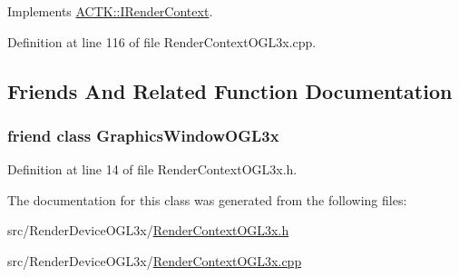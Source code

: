 Implements \hyperlink{class_a_c_t_k_1_1_i_render_context_a54c06790c64d628be8d6c164c375e4fb}{A\-C\-T\-K\-::\-I\-Render\-Context}.



Definition at line 116 of file Render\-Context\-O\-G\-L3x.\-cpp.



\subsection{Friends And Related Function Documentation}
\hypertarget{class_a_c_t_k_1_1_render_context_o_g_l3x_a9b67093b8ba94e79db00917996d1440a}{
\subsubsection[{Graphics\-Window\-O\-G\-L3x}]{\setlength{\rightskip}{0pt plus 5cm}friend class {\bf Graphics\-Window\-O\-G\-L3x}\hspace{0.3cm}{\ttfamily [friend]}}}\label{class_a_c_t_k_1_1_render_context_o_g_l3x_a9b67093b8ba94e79db00917996d1440a}


Definition at line 14 of file Render\-Context\-O\-G\-L3x.\-h.



The documentation for this class was generated from the following files\-:\begin{DoxyCompactItemize}
\item 
src/\-Render\-Device\-O\-G\-L3x/\hyperlink{_render_context_o_g_l3x_8h}{Render\-Context\-O\-G\-L3x.\-h}\item 
src/\-Render\-Device\-O\-G\-L3x/\hyperlink{_render_context_o_g_l3x_8cpp}{Render\-Context\-O\-G\-L3x.\-cpp}\end{DoxyCompactItemize}
